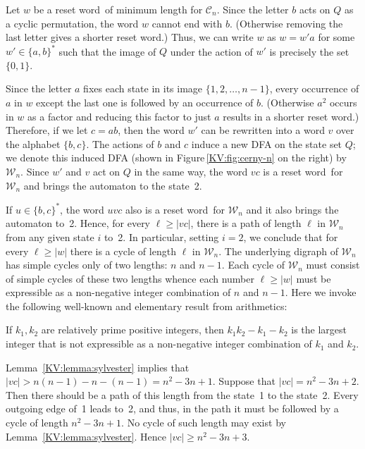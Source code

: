 \documentclass{irmaart}
\newcommand{\sw}{reset word}
\begin{document}
Let $w$ be a \sw\ of minimum length for $\mathcal{C}_n$. Since the
letter $b$ acts on $Q$ as a cyclic permutation, the word $w$
cannot end with $b$. (Otherwise removing the last letter gives a
shorter \sw.) Thus, we can write $w$ as $w = w'a$ for some
$w'\in\{a,b\}^*$ such that the image of $Q$ under the action of
$w'$ is precisely the set $\{0,1\}$.

Since the letter $a$ fixes each state in its image
$\{1,2,\dots,n-1\}$, every occurrence of $a$ in $w$ except the
last one is followed by an occurrence of $b$. (Otherwise $a^2$
occurs in $w$ as a factor and reducing this factor to just $a$
results in a shorter \sw.) Therefore, if we let $c=ab$, then the
word $w'$ can be rewritten into a word $v$ over the alphabet
$\{b,c\}$. The actions of $b$ and $c$ induce a new DFA on the
state set $Q$; we denote this induced DFA (shown in
Figure\,\ref{KV:fig:cerny-n} on the right) by $\mathcal{W}_n$.
Since $w'$ and $v$ act on $Q$ in the same way, the word $vc$ is a
\sw\ for $\mathcal{W}_n$ and brings the automaton to the state~2.

If $u\in\{b,c\}^*$, the word $uvc$ also is a \sw\ for
$\mathcal{W}_n$ and it also brings the automaton to~2. Hence, for
every $\ell\ge|vc|$, there is a path of length $\ell$ in
$\mathcal{W}_n$ from any given state $i$ to~2. In particular,
setting $i=2$, we conclude that for every $\ell\ge|w|$ there is a
cycle of length $\ell$ in $\mathcal{W}_n$. The underlying digraph
of $\mathcal{W}_n$ has simple cycles only of two lengths: $n$ and
$n-1$. Each cycle of $\mathcal{W}_n$ must consist of simple cycles
of these two lengths whence each number $\ell\ge|w|$ must be
expressible as a non-negative integer combination of $n$ and
$n-1$. Here we invoke the following well-known and elementary
result from arithmetics:

\begin{lemma}
\label{KV:lemma:sylvester} If $k_1,k_2$ are relatively prime
positive integers, then $k_1k_2-k_1-k_2$ is the largest integer
that is not expressible as a non-negative integer combination of
$k_1$ and $k_2$.
\end{lemma}

Lemma~\ref{KV:lemma:sylvester} implies that
$|vc|>n(n-1)-n-(n-1)=n^2-3n+1$. Suppose that $|vc|=n^2-3n+2$. Then
there should be a path of this length from the state~1 to the
state~2. Every outgoing edge of~1 leads to~2, and thus, in the
path it must be followed by a cycle of length $n^2-3n+1$. No cycle
of such length may exist by Lemma~\ref{KV:lemma:sylvester}. Hence
$|vc|\ge n^2-3n+3$.
\end{document}
